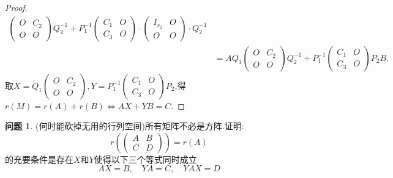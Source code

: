\documentclass[11pt]{ctexart}
\theoremstyle{definition}
\newtheorem{qqq}{问题}[section]
\numberwithin{equation}{section}
\begin{document}
\begin{proof}
\begin{align*}
\begin{pmatrix}
            O&C_2\\O&O
        \end{pmatrix}Q^{-1}_2+P_1^{-1}\begin{pmatrix}
        C_1&O\\C_3&O
        \end{pmatrix}\cdot \begin{pmatrix}
        I_{r_2}&O\\O&O
        \end{pmatrix} \cdot Q^{-1}_2\\
        &=AQ_1\begin{pmatrix}
            O&C_2\\O&O
        \end{pmatrix}Q_2^{-1}+P_1^{-1}\begin{pmatrix}
            C_1&O\\C_3&O
            \end{pmatrix}P_2B.
    \end{align*}
    取$X=Q_1\begin{pmatrix}
        O&C_2\\O&O
    \end{pmatrix},Y=P_1^{-1}\begin{pmatrix}
        C_1&O\\C_3&O
        \end{pmatrix}P_2$,得$r(M)=r(A)+r(B)\Leftrightarrow AX+YB=C.$
\end{proof}
\begin{qqq}
    (何时能砍掉无用的行列空间)所有矩阵不必是方阵.证明:
    $$r\left( \begin{pmatrix}
        A&B\\C&D
    \end{pmatrix}\right) =r(A)$$
    的充要条件是存在$X$和$Y$使得以下三个等式同时成立$$AX=B,\quad YA=C,\quad YAX=D$$
\end{qqq}
\end{document}
